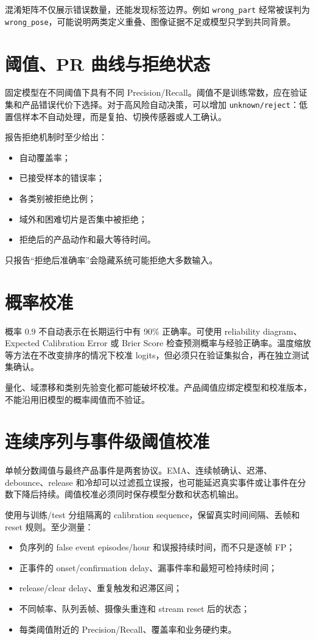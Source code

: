 混淆矩阵不仅展示错误数量，还能发现标签边界。例如 \texttt{wrong\_part} 经常被误判为 \texttt{wrong\_pose}，可能说明两类定义重叠、图像证据不足或模型只学到共同背景。

\section{阈值、PR 曲线与拒绝状态}

固定模型在不同阈值下具有不同 Precision/Recall。阈值不是训练常数，应在验证集和产品错误代价下选择。对于高风险自动决策，可以增加 \texttt{unknown/reject}：低置信样本不自动处理，而是复拍、切换传感器或人工确认。

报告拒绝机制时至少给出：

\begin{itemize}
  \item 自动覆盖率；
  \item 已接受样本的错误率；
  \item 各类别被拒绝比例；
  \item 域外和困难切片是否集中被拒绝；
  \item 拒绝后的产品动作和最大等待时间。
\end{itemize}

只报告“拒绝后准确率”会隐藏系统可能拒绝大多数输入。

\section{概率校准}

概率 0.9 不自动表示在长期运行中有 90\% 正确率。可使用 reliability diagram、Expected Calibration Error 或 Brier Score 检查预测概率与经验正确率。温度缩放等方法在不改变排序的情况下校准 logits，但必须只在验证集拟合，再在独立测试集确认。

量化、域漂移和类别先验变化都可能破坏校准。产品阈值应绑定模型和校准版本，不能沿用旧模型的概率阈值而不验证。

\section{连续序列与事件级阈值校准}

单帧分数阈值与最终产品事件是两套协议。EMA、连续帧确认、迟滞、debounce、release 和冷却可以过滤孤立误报，也可能延迟真实事件或让事件在分数下降后持续。阈值校准必须同时保存模型分数和状态机输出。

使用与训练/test 分组隔离的 calibration sequence，保留真实时间间隔、丢帧和 reset 规则。至少测量：

\begin{itemize}
  \item 负序列的 false event episodes/hour 和误报持续时间，而不只是逐帧 FP；
  \item 正事件的 onset/confirmation delay、漏事件率和最短可检持续时间；
  \item release/clear delay、重复触发和迟滞区间；
  \item 不同帧率、队列丢帧、摄像头重连和 stream reset 后的状态；
  \item 每类阈值附近的 Precision/Recall、覆盖率和业务硬约束。
\end{itemize}

